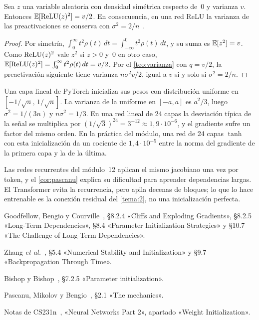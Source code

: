 \begin{proposicion}[Inicialización de He]\label{prop:he}
Sea $z$ una variable aleatoria con densidad simétrica respecto de~0 y varianza $v$. Entonces $\mathbb{E}[\operatorname{ReLU}(z)^{2}]=v/2$. En consecuencia, en una red ReLU la varianza de las preactivaciones se conserva con $\sigma^{2}=2/n$~\cite{he-init}.
\end{proposicion}

\begin{proof}
Por simetría, $\int_{0}^{\infty}t^{2}\rho(t)\,dt=\int_{-\infty}^{0}t^{2}\rho(t)\,dt$, y su suma es $\mathbb{E}[z^{2}]=v$. Como $\operatorname{ReLU}(z)^{2}$ vale $z^{2}$ si $z>0$ y~0 en otro caso, $\mathbb{E}[\operatorname{ReLU}(z)^{2}]=\int_{0}^{\infty}t^{2}\rho(t)\,dt=v/2$. Por el \cref{teo:varianza} con $q=v/2$, la preactivación siguiente tiene varianza $n\sigma^{2}v/2$, igual a $v$ si y solo si $\sigma^{2}=2/n$.
\end{proof}

\begin{ejemplo}\label{ej:pytorch}
Una capa lineal de PyTorch inicializa sus pesos con distribución uniforme en $[-1/\sqrt n,\,1/\sqrt n]$. La varianza de la uniforme en $[-a,a]$ es $a^{2}/3$, luego $\sigma^{2}=1/(3n)$ y $n\sigma^{2}=1/3$. En una red lineal de 24 capas la desviación típica de la señal se multiplica por $(1/\sqrt3)^{24}=3^{-12}\approx 1{,}9\cdot 10^{-6}$, y el gradiente sufre un factor del mismo orden. En la práctica del módulo, una red de 24 capas $\tanh$ con esta inicialización da un cociente de $1{,}4\cdot 10^{-5}$ entre la norma del gradiente de la primera capa y la de la última.
\end{ejemplo}

\begin{observacion}
Las redes recurrentes del módulo~12 aplican el mismo jacobiano una vez por token, y el \cref{cor:pascanu} explica su dificultad para aprender dependencias largas. El Transformer evita la recurrencia, pero apila decenas de bloques; lo que lo hace entrenable es la conexión residual del \cref{tema:2}, no una inicialización perfecta.
\end{observacion}

\begin{lecturas}
\item Goodfellow, Bengio y Courville~\cite{gbc}, §8.2.4 «Cliffs and Exploding Gradients», §8.2.5 «Long-Term Dependencies», §8.4 «Parameter Initialization Strategies» y §10.7 «The Challenge of Long-Term Dependencies».
\item Zhang \emph{et al.}~\cite{d2l}, §5.4 «Numerical Stability and Initialization» y §9.7 «Backpropagation Through Time».
\item Bishop y Bishop~\cite{bishopdl}, §7.2.5 «Parameter initialization».
\item Pascanu, Mikolov y Bengio~\cite{pascanu}, §2.1 «The mechanics».
\item Notas de CS231n~\cite{cs231n}, «Neural Networks Part 2», apartado «Weight Initialization».
\end{lecturas}

